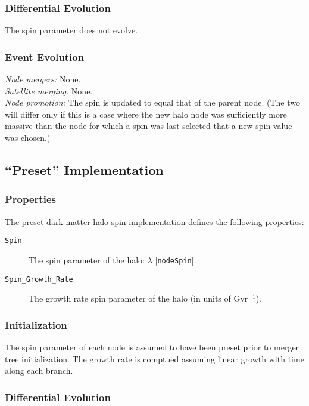 \subsubsection{Differential Evolution}

The spin parameter does not evolve.

\subsubsection{Event Evolution}

\noindent\emph{Node mergers:} None.\\

\noindent\emph{Satellite merging:} None.\\

\noindent\emph{Node promotion:} The spin is updated to equal that of the parent node. (The two will differ only if this is a case where the new halo node was sufficiently more massive than the node for which a spin was last selected that a new spin value was chosen.)\\

\subsection{``Preset'' Implementation}

\subsubsection{Properties}

The preset dark matter halo spin implementation defines the following properties:
\begin{description}
 \item [{\tt Spin}] The spin parameter of the halo: $\lambda$ [{\tt nodeSpin}].
 \item [{\tt Spin\_Growth\_Rate}] The growth rate spin parameter of the halo (in units of Gyr$^{-1}$).
\end{description}

\subsubsection{Initialization}

The spin parameter of each node is assumed to have been preset prior to merger tree initialization. The growth rate is comptued assuming linear growth with time along each branch.

\subsubsection{Differential Evolution}

